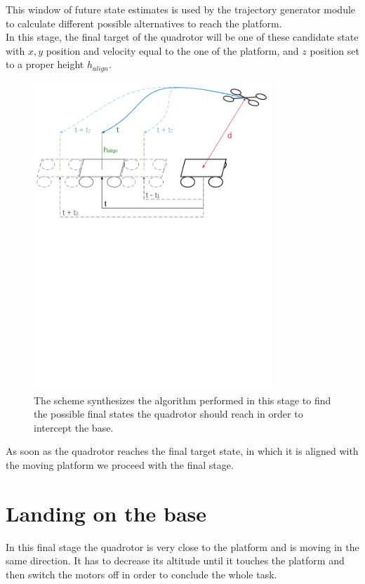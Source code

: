 This window of future state estimates is used by the trajectory generator module to calculate different possible alternatives to reach the platform.\\
In this stage, the final target of the quadrotor will be one of these candidate state with $x,y$ position and velocity equal to the one of the platform, and $z$ position set to a proper height $h_{align}$.\\

\begin{figure}[!htbp]
    \centering
    \includegraphics[width=0.8\textwidth]{img/prediction_platform.pdf}
    \caption{The scheme synthesizes the algorithm performed in this stage to find the possible final states the quadrotor should reach in order to intercept the base. }
    \label{fig:align_platform}
\end{figure}

As soon as the quadrotor reaches the final target state, in which it is aligned with the moving platform we proceed with the final stage.

\section{Landing on the base}
In this final stage the quadrotor is very close to the platform and is moving in the same direction. It has to decrease its altitude until it touches the platform and then switch the motors off in order to conclude the whole task.\\

